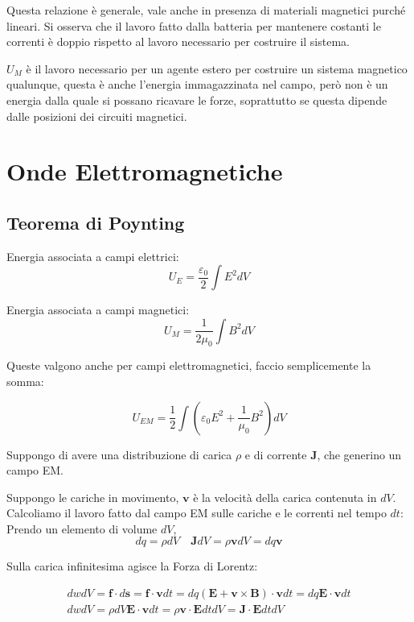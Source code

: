 \documentclass[a4paper]{scrarticle}
\begin{document}
Questa relazione è generale, vale anche in presenza di materiali magnetici purché lineari. Si osserva che il lavoro fatto dalla batteria per mantenere costanti le correnti è doppio rispetto al lavoro necessario per costruire il sistema.

$U_M$ è il lavoro necessario per un agente estero per costruire un sistema magnetico qualunque, questa è anche l'energia immagazzinata nel campo, però non è un energia dalla quale si possano ricavare le forze, soprattutto se questa dipende dalle posizioni dei circuiti magnetici.

\section{Onde Elettromagnetiche}

\subsection{Teorema di Poynting}

Energia associata a campi elettrici:
\begin{equation*}
    U_E = \frac{\varepsilon_0}{2} \int E^2 dV 
\end{equation*}

Energia associata a campi magnetici:
\begin{equation*}
    U_M = \frac{1}{2 \mu_0} \int B^2 dV
\end{equation*}

Queste valgono anche per campi elettromagnetici, faccio semplicemente la somma:

\begin{equation}
    U_{EM} = \frac{1}{2} \int (\varepsilon_0 E^2 + \frac{1}{\mu_0} B^2)dV
\end{equation}

Suppongo di avere una distribuzione di carica $\rho$ e di corrente $\bm J$, che generino un campo EM.

Suppongo le cariche in movimento, $\bm v$ è la velocità della carica contenuta in $dV$.
Calcoliamo il lavoro fatto dal campo EM sulle cariche e le correnti nel tempo $dt$:
Prendo un elemento di volume $dV$,
\begin{equation*}
    dq = \rho dV \quad \bm J dV = \rho \bm v dV = dq \bm v
\end{equation*}

Sulla carica infinitesima agisce la Forza di Lorentz:

\begin{gather*}
    dw dV = \bm f \cdot d\bm s = \bm f \cdot \bm v dt = dq (\bm E + \bm v\times \bm B )\cdot \bm v dt = dq \bm E \cdot \bm v dt\\
    dw dV = \rho dV \bm E \cdot \bm v dt = \rho \bm v \cdot \bm E dtdV = \bm J \cdot \bm E dtdV
\end{gather*}
\end{document}
